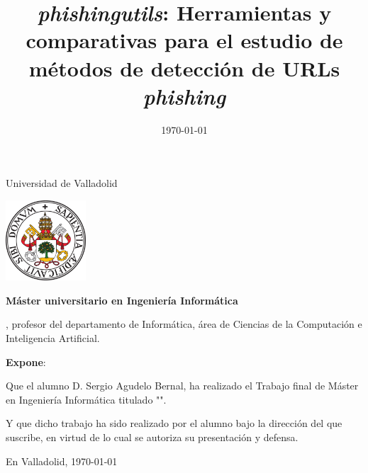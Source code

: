 \documentclass[a4paper,12pt,oneside,oldfontcommands]{memoir}
\title{\textit{phishingutils}: Herramientas y comparativas para el estudio de métodos de detección de URLs \textit{phishing}}
\author{\nombre}
\date{\today}
\newcommand{\nombre}[0]{Sergio Agudelo Bernal} %
\newcommand{\depto}[0]{Informática}
\newcommand{\areac}[0]{Ciencias de la Computación e Inteligencia Artificial}
\begin{document}
\maketitle


\newpage\null\thispagestyle{empty}\newpage


\thispagestyle{empty}


\noindent
\begin{center}%
	{\noindent\Huge Universidad de Valladolid}\vspace{.5cm}%

	\begin{center}%
		\includegraphics[height=3cm]{img/escudoUVA} \hspace{1cm}
	\end{center}%

	{\noindent\Large \textbf{Máster universitario en Ingeniería Informática}}\vspace{.5cm}%
\end{center}%



\noindent \makeatletter\@tutor\makeatother, profesor del departamento de \depto, área de \areac.

\noindent \textbf{Expone}:

\noindent Que el alumno D. \nombre, %
ha realizado el Trabajo final de Máster en Ingeniería Informática titulado "\makeatletter\textsc{\@title{}}\makeatother".

\noindent Y que dicho trabajo ha sido realizado por el alumno bajo la dirección del que suscribe, en virtud de lo cual se autoriza su presentación y defensa.

\begin{center} %
	En Valladolid, {\large \today}
\end{center}

\vfill\vfill\vfill

\end{document}
